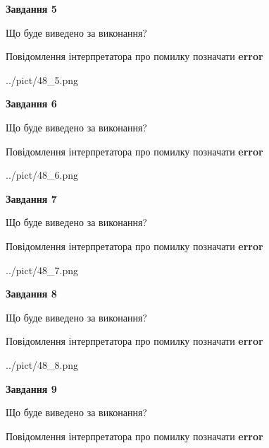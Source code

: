 \documentclass[11pt, ukrainian]{article}
\begin{document}
{\begin {large}
{\begin {center}\textbf{Завдання 5}\end {center}}\par
Що буде виведено за виконання? \par
Повідомлення інтерпретатора про помилку позначати \textbf{error}

\begin{center}
	{../pict/48_5.png}
\end{center}
\newpage

{\begin {center}\textbf{Завдання 6}\end {center}}\par
Що буде виведено за виконання? \par
Повідомлення інтерпретатора про помилку позначати \textbf{error}

\begin{center}
	{../pict/48_6.png}
\end{center}
\newpage

{\begin {center}\textbf{Завдання 7}\end {center}}\par
Що буде виведено за виконання? \par
Повідомлення інтерпретатора про помилку позначати \textbf{error}

\begin{center}
	{../pict/48_7.png}
\end{center}
\newpage

{\begin {center}\textbf{Завдання 8}\end {center}}\par
Що буде виведено за виконання? \par
Повідомлення інтерпретатора про помилку позначати \textbf{error}

\begin{center}
	{../pict/48_8.png}
\end{center}
\newpage

{\begin {center}\textbf{Завдання 9}\end {center}}\par
Що буде виведено за виконання? \par
Повідомлення інтерпретатора про помилку позначати \textbf{error}


\end{large}}
\end{document}

